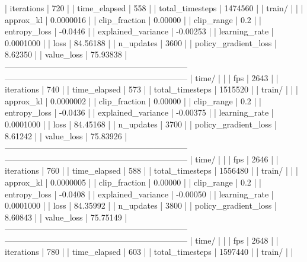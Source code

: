 |    iterations           |          720 |
|    time_elapsed         |          558 |
|    total_timesteps      |      1474560 |
| train/                  |              |
|    approx_kl            |    0.0000016 |
|    clip_fraction        |      0.00000 |
|    clip_range           |          0.2 |
|    entropy_loss         |      -0.0446 |
|    explained_variance   |     -0.00253 |
|    learning_rate        |    0.0001000 |
|    loss                 |     84.56188 |
|    n_updates            |         3600 |
|    policy_gradient_loss |      8.62350 |
|    value_loss           |     75.93838 |
------------------------------------------------------------------
------------------------------------------------------------------
| time/                   |              |
|    fps                  |         2643 |
|    iterations           |          740 |
|    time_elapsed         |          573 |
|    total_timesteps      |      1515520 |
| train/                  |              |
|    approx_kl            |    0.0000002 |
|    clip_fraction        |      0.00000 |
|    clip_range           |          0.2 |
|    entropy_loss         |      -0.0436 |
|    explained_variance   |     -0.00375 |
|    learning_rate        |    0.0001000 |
|    loss                 |     84.45168 |
|    n_updates            |         3700 |
|    policy_gradient_loss |      8.61242 |
|    value_loss           |     75.83926 |
------------------------------------------------------------------
------------------------------------------------------------------
| time/                   |              |
|    fps                  |         2646 |
|    iterations           |          760 |
|    time_elapsed         |          588 |
|    total_timesteps      |      1556480 |
| train/                  |              |
|    approx_kl            |    0.0000005 |
|    clip_fraction        |      0.00000 |
|    clip_range           |          0.2 |
|    entropy_loss         |      -0.0408 |
|    explained_variance   |     -0.00050 |
|    learning_rate        |    0.0001000 |
|    loss                 |     84.35992 |
|    n_updates            |         3800 |
|    policy_gradient_loss |      8.60843 |
|    value_loss           |     75.75149 |
------------------------------------------------------------------
------------------------------------------------------------------
| time/                   |              |
|    fps                  |         2648 |
|    iterations           |          780 |
|    time_elapsed         |          603 |
|    total_timesteps      |      1597440 |
| train/                  |              |
